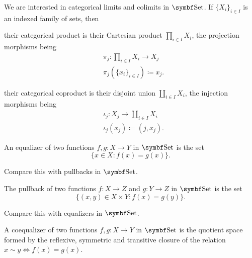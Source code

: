 \begin{proposition}\label{thm:set_categorical_limits}
  We are interested in categorical limits and colimits in \( \Cat{Set} \). If \( \{ X_i \}_{i \in I} \) is an indexed family of sets, then
  \begin{defenum}
     their categorical product is their Cartesian product \( \prod_{i \in I} X_i \), the projection morphisms being
    \begin{align*}
      &\pi_j: \prod_{i \in I} X_i \to X_j \\
      &\pi_j(\{ x_i \}_{i \in I}) \coloneqq x_j.
    \end{align*}

     their categorical coproduct is their disjoint union \( \coprod_{i \in I} X_i \), the injection morphisms being
    \begin{align*}
      &\iota_j: X_j \to \coprod_{i \in I} X_i \\
      &\iota_j(x_j) \coloneqq (j, x_j).
    \end{align*}

     An equalizer of two functions \( f, g: X \to Y \) in \( \Cat{Set} \) is the set
    \begin{equation*}
      \{ x \in X \colon f(x) = g(x) \}.
    \end{equation*}

    Compare this with pullbacks in \( \Cat{Set} \).

     The pullback of two functions \( f: X \to Z \) and \( g: Y \to Z \) in \( \Cat{Set} \) is the set
    \begin{equation*}
      \{ (x, y) \in X \times Y \colon f(x) = g(y) \}.
    \end{equation*}

    Compare this with equalizers in \( \Cat{Set} \).

     A coequalizer of two functions \( f, g: X \to Y \) in \( \Cat{Set} \) is the quotient space formed by the reflexive, symmetric and transitive closure of the relation \( x \sim y \iff f(x) = g(x) \).


\end{defenum}
\end{proposition}
